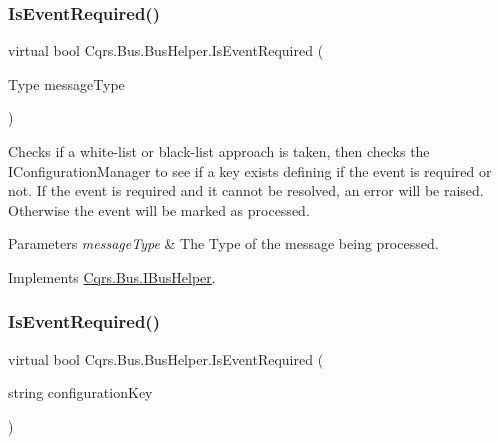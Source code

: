 \subsubsection{\texorpdfstring{Is\+Event\+Required()}{IsEventRequired()}\hspace{0.1cm}{\footnotesize\ttfamily [1/2]}}
{\footnotesize\ttfamily virtual bool Cqrs.\+Bus.\+Bus\+Helper.\+Is\+Event\+Required (\begin{DoxyParamCaption}\item[{Type}]{message\+Type }\end{DoxyParamCaption})\hspace{0.3cm}{\ttfamily [virtual]}}



Checks if a white-\/list or black-\/list approach is taken, then checks the I\+Configuration\+Manager to see if a key exists defining if the event is required or not. If the event is required and it cannot be resolved, an error will be raised. Otherwise the event will be marked as processed. 


\begin{DoxyParams}{Parameters}
{\em message\+Type} & The Type of the message being processed.\\
\hline
\end{DoxyParams}


Implements \hyperlink{interfaceCqrs_1_1Bus_1_1IBusHelper_acddf7635d6de08e3b09d552361fe4fda_acddf7635d6de08e3b09d552361fe4fda}{Cqrs.\+Bus.\+I\+Bus\+Helper}.

\mbox{\label{classCqrs_1_1Bus_1_1BusHelper_a60a9603d5c6b7f29ee42491475714895_a60a9603d5c6b7f29ee42491475714895}} 
\subsubsection{\texorpdfstring{Is\+Event\+Required()}{IsEventRequired()}\hspace{0.1cm}{\footnotesize\ttfamily [2/2]}}
{\footnotesize\ttfamily virtual bool Cqrs.\+Bus.\+Bus\+Helper.\+Is\+Event\+Required (\begin{DoxyParamCaption}\item[{string}]{configuration\+Key }\end{DoxyParamCaption})\hspace{0.3cm}{\ttfamily [virtual]}}



